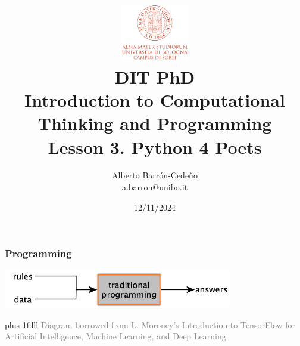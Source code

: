 \documentclass[xcolor=x11names,handout]{beamer}
\title[DIT, PhD]{\vspace{-2pt}\\
\href{http://www.dit.unibo.it}{\includegraphics[width=30mm]{img/UNIBO_logo.png}
} \\
\vspace{6mm} {DIT PhD\\ Introduction to Computational Thinking and Programming} 
\\
{\large Lesson 3. Python 4 Poets}
\vspace{-5mm}}
\author[A. Barr\'on-Cede\~no]{{Alberto Barr\'on-Cede\~no \\ a.barron@unibo.it
\vspace{-8mm}}
\institute[DIT-UniBO]{DIT-UniBO}}
\date[2024]{12/11/2024}
\newcommand{\light}[1]{\textcolor{gray}{#1}}
\newcommand{\btVFill}{\vskip0pt plus 1filll}
\begin{document}
{%
	\begin{frame}[plain]
		\titlepage
	\end{frame}
}

\begin{frame}
\frametitle{Programming}
\vspace{5mm}

\begin{center}
\includegraphics[width=100mm]{img/coli2020_diagrams_traditional_programming.png}
\end{center}

\btVFill
\footnotesize
\light{Diagram borrowed from L. Moroney's Introduction to TensorFlow for Artificial Intelligence, Machine Learning, and Deep Learning}
\end{frame}
\end{document}
